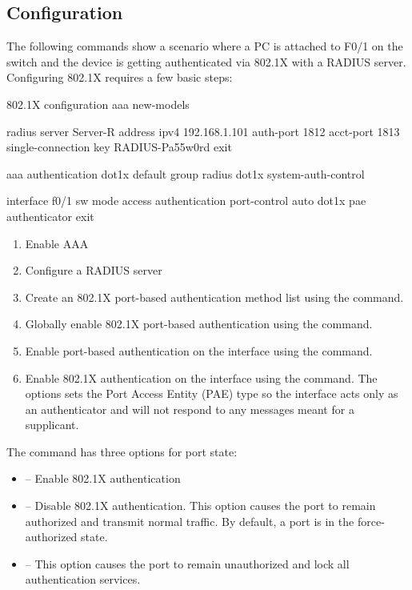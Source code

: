 \subsection{Configuration}

The following commands show a scenario where a PC is attached to F0/1 on the switch and the device is getting authenticated via 802.1X with a RADIUS server. Configuring 802.1X requires a few basic steps:

\begin{sexylisting}{802.1X configuration}
aaa new-models



radius server Server-R
  address ipv4 192.168.1.101 auth-port 1812 acct-port 1813
  single-connection
  key RADIUS-Pa55w0rd
  exit
 
aaa authentication dot1x default group radius
dot1x system-auth-control

interface f0/1
  sw mode access
  authentication port-control auto
  dot1x pae authenticator
  exit
\end{sexylisting}

\begin{enumerate}
\item Enable AAA 
\item Configure a RADIUS server
\item Create an 802.1X port-based authentication method list using the  command.
\item Globally enable 802.1X port-based authentication using the  command.
\item Enable port-based authentication on the interface using the  command.
\item Enable 802.1X authentication on the interface using the  command. The  options sets the Port Access Entity (PAE) type so the interface acts only as an authenticator and will not respond to any messages meant for a supplicant.
\end{enumerate}

The  command has three options for port state:

\begin{itemize}
\item {} -- Enable 802.1X authentication
\item {} -- Disable 802.1X authentication. This option causes the port to remain authorized and transmit normal traffic. By default, a port is in the force-authorized state.
\item {} -- This option causes the port to remain unauthorized and lock all authentication services.
\end{itemize}